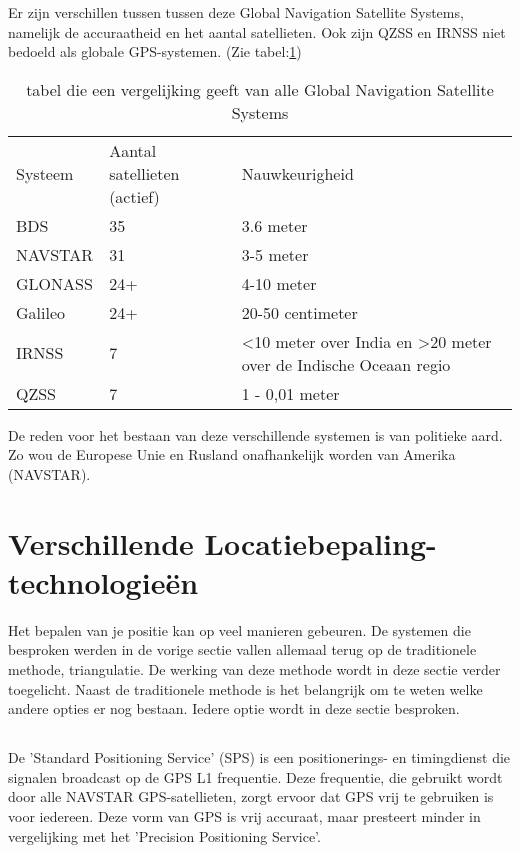 Er zijn verschillen tussen tussen deze Global Navigation Satellite Systems, namelijk de accuraatheid en het aantal satellieten. Ook zijn QZSS en IRNSS niet bedoeld als globale GPS-systemen. (Zie tabel:\ref{tab:GNSS-vergelijking})
\begin{table}[]
	\begin{tabular}{lll}
		Systeem & Aantal satellieten (actief) & Nauwkeurigheid                                                                        \\
				BDS     & 35                          & 3.6 meter                                                                      \\
		NAVSTAR & 31                          & 3-5 meter                                                                             \\
		GLONASS & 24+                         & 4-10 meter                                                                            \\
		Galileo & 24+                         & 20-50 centimeter                                                                      \\
		IRNSS   & 7                           & \textless 10 meter over India en \textgreater{}20 meter over de Indische Oceaan regio \\
		QZSS    & 7                           & 1 - 0,01 meter                                                                       
	\end{tabular}
\label{tab:GNSS-vergelijking}
\caption{tabel die een vergelijking geeft van alle Global Navigation Satellite Systems}
\autocite{gnss}
\end{table}
\newline
De reden voor het bestaan van deze verschillende systemen is van politieke aard. Zo wou de Europese Unie en Rusland onafhankelijk worden van Amerika (NAVSTAR). 

\section{Verschillende Locatiebepaling-technologieën}
Het bepalen van je positie kan op veel manieren gebeuren. De systemen die besproken werden in de vorige sectie vallen allemaal terug op de traditionele methode, triangulatie. De werking van deze methode wordt in deze sectie verder toegelicht. Naast de traditionele methode is het belangrijk om te weten welke andere opties er nog bestaan. Iedere optie wordt in deze sectie besproken.
\subsection{}
De 'Standard Positioning Service' (SPS) is een positionerings- en timingdienst die signalen broadcast op de GPS L1 frequentie. Deze frequentie, die gebruikt wordt door alle NAVSTAR GPS-satellieten, zorgt ervoor dat GPS vrij te gebruiken is voor iedereen. \autocite{gps}
\newline
Deze vorm van GPS is vrij accuraat, maar presteert minder in vergelijking met het 'Precision Positioning Service'. 
